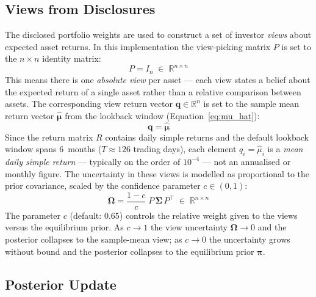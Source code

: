 \documentclass[11pt, a4paper]{article}
\begin{document}
\subsection{Views from Disclosures}

The disclosed portfolio weights are used to construct a set of investor
\emph{views} about expected asset returns. In this implementation the
view-picking matrix $P$ is set to the $n \times n$ identity matrix:
\begin{equation}
  P = I_n \;\in\; \mathbb{R}^{n \times n}
  \label{eq:P}
\end{equation}
This means there is one \emph{absolute view} per asset --- each view states a
belief about the expected return of a single asset rather than a relative
comparison between assets. The corresponding view return vector
$\bm{q} \in \mathbb{R}^{n}$ is set to the sample mean return vector
$\hat{\bm{\mu}}$ from the lookback window (Equation~\ref{eq:mu_hat}):
\begin{equation}
  \bm{q} = \hat{\bm{\mu}}
  \label{eq:q}
\end{equation}
Since the return matrix $R$ contains daily simple returns and the default
lookback window spans 6~months ($T \approx 126$ trading days), each element
$q_i = \hat{\mu}_i$ is a \emph{mean daily simple return} --- typically on the
order of $10^{-4}$ --- not an annualised or monthly figure.
The uncertainty in these views is modelled as proportional to the prior
covariance, scaled by the confidence parameter $c \in (0, 1)$:
\begin{equation}
  \bm{\Omega} = \frac{1 - c}{c}\;P\,\bm{\Sigma}\,P^{\top}
  \;\in\; \mathbb{R}^{n \times n}
  \label{eq:omega}
\end{equation}
The parameter $c$ (default: $0.65$) controls the relative weight given to
the views versus the equilibrium prior. As $c \to 1$ the view uncertainty
$\bm{\Omega} \to 0$ and the posterior collapses to the sample-mean view; as
$c \to 0$ the uncertainty grows without bound and the posterior collapses to
the equilibrium prior $\bm{\pi}$.

\subsection{Posterior Update}
\end{document}
